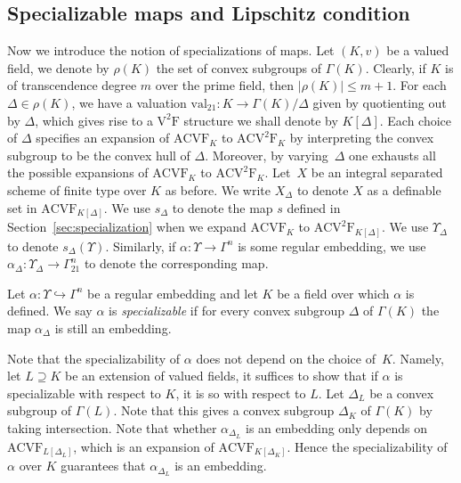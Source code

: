 \documentclass[JEP,XML,SOM,Unicode,ThmDefs,NoEqCountersInSection,published]{cedram}
\newcommand{\val}{\mathrm{val}}
\newcommand{\acvsf}{\mathrm{ACV}^2\mathrm{F}}
\newcommand{\vsf}{\mathrm{V}^2\mathrm{F}}
\newcommand{\acvf}{\mathrm{ACVF}}
\theoremstyle{plain}
\theoremstyle{definition}
\begin{document}
\subsection{Specializable maps and Lipschitz condition}
Now we introduce the notion of specializations of maps. Let $(K,v)$ be a valued field, we denote by $\rho(K)$ the set of convex subgroups of $\Gamma(K)$. Clearly, if $K$ is of transcendence degree $m$ over the prime field, then $|\rho(K)|\leq m+1$. For each $\Delta\in \rho(K)$, we have a valuation $\val_{21}:K\to \Gamma(K)/\Delta$ given by quotienting out by $\Delta$, which gives rise to a $\vsf$ structure we shall denote by $K[\Delta]$. Each choice
of $\Delta$ specifies an expansion of $\acvf_K$ to $\acvsf_{K}$ by interpreting the convex subgroup to be the convex hull of $\Delta$. Moreover, by varying~$\Delta$ one exhausts all the possible expansions of $\acvf_K$ to $\acvsf_{K}$. Let~$X$ be an integral separated scheme of finite type over $K$ as before. We write $X_\Delta$ to denote $X$ as a definable set in $\acvf_{K[\Delta]}$. We use $s_\Delta$ to denote the map $s$ defined in Section~\ref{sec:specialization} when we expand $\acvf_K$ to $\acvsf_{K[\Delta]}$. We use $\Upsilon_\Delta$ to denote $s_\Delta(\Upsilon)$. Similarly, if $\alpha:\Upsilon\to \Gamma^n$ is some regular embedding, we use $\alpha_\Delta:\Upsilon_\Delta\to \Gamma_{21}^n$ to denote the corresponding map.
\begin{defi}
Let $\alpha:\Upsilon \hookrightarrow \Gamma^n$ be a regular embedding and
let $K$ be a field over which
$\alpha$ is defined. We say $\alpha$ is \emph{specializable} if
for every convex subgroup $\Delta$ of $\Gamma(K)$ the map $\alpha_\Delta$ is still an embedding.
\end{defi}

\begin{rema}\label{rem:parameter}
Note that the specializability of $\alpha$ does not depend on the choice of~$K$. Namely, let $L\supseteq K$ be an extension of valued fields, it suffices to show that if $\alpha$ is specializable with respect to $K$, it is so with respect to $L$. Let $\Delta_L$ be a convex subgroup of $\Gamma(L)$. Note that this gives a convex subgroup $\Delta_K$ of $\Gamma(K)$ by taking intersection. Note that whether $\alpha_{\Delta_L}$ is an embedding only depends on $\acvf_{L[\Delta_L]}$, which is an expansion of $\acvf_{K[\Delta_K]}$. Hence the specializability of $\alpha$ over $K$ guarantees that $\alpha_{\Delta_L}$ is an embedding.
\end{rema}
\end{document}
